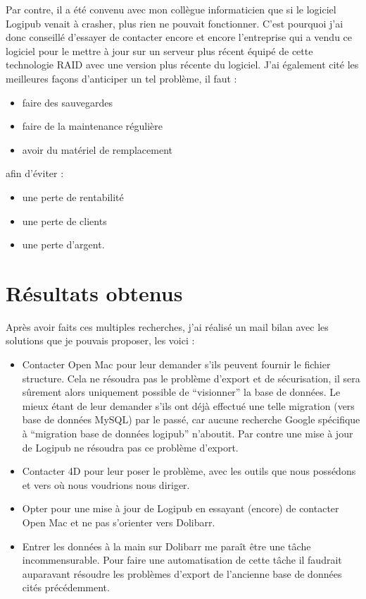\documentclass[report]{tnreport}
\begin{document}
Par contre, il a été convenu avec mon collègue informaticien que si le logiciel Logipub venait à crasher, plus rien ne pouvait fonctionner. C’est pourquoi j’ai donc conseillé d’essayer de contacter encore et encore l’entreprise qui a vendu ce logiciel pour le mettre à jour sur un serveur plus récent équipé de cette technologie RAID avec une version plus récente du logiciel. J’ai également cité les meilleures façons d’anticiper un tel problème, il faut :
\begin{itemize}
\item faire des sauvegardes
\item faire de la maintenance régulière
\item avoir du matériel de remplacement
\end{itemize}
afin d’éviter :
\begin{itemize}
\item une perte de rentabilité
\item une perte de clients
\item une perte d’argent.
\end{itemize}

\section{Résultats obtenus}

Après avoir faits ces multiples recherches, j’ai réalisé un mail bilan avec les solutions que je pouvais proposer, les voici :

\begin{itemize}
\item Contacter Open Mac pour leur demander s’ils peuvent fournir le fichier structure. Cela ne résoudra pas le problème d’export et de sécurisation, il sera sûrement alors uniquement possible de “visionner” la base de données. Le mieux étant de leur demander s’ils ont déjà effectué une telle migration (vers base de données MySQL) par le passé, car aucune recherche Google spécifique à “migration base de données logipub” n’aboutit. Par contre une mise à jour de Logipub ne résoudra pas ce problème d’export.
\item Contacter 4D pour leur poser le problème, avec les outils que nous possédons et vers où nous voudrions nous diriger.
\item Opter pour une mise à jour de Logipub en essayant (encore) de contacter Open Mac et ne pas s’orienter vers Dolibarr.
\item Entrer les données à la main sur Dolibarr me paraît être une tâche incommensurable. Pour faire une automatisation de cette tâche il faudrait auparavant résoudre les problèmes d’export de l’ancienne base de données cités précédemment.
\end{itemize}
\end{document}
